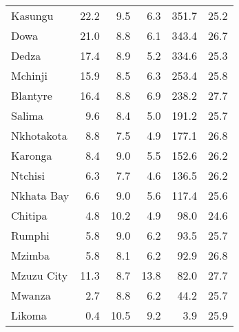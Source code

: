 \begin{tabular}{lrrrrr}
Kasungu       &        22.2 &         9.5 &          6.3 &            351.7 &        25.2 \\
Dowa          &        21.0 &         8.8 &          6.1 &            343.4 &        26.7 \\
Dedza         &        17.4 &         8.9 &          5.2 &            334.6 &        25.3 \\
Mchinji       &        15.9 &         8.5 &          6.3 &            253.4 &        25.8 \\
Blantyre      &        16.4 &         8.8 &          6.9 &            238.2 &        27.7 \\
Salima        &         9.6 &         8.4 &          5.0 &            191.2 &        25.7 \\
Nkhotakota    &         8.8 &         7.5 &          4.9 &            177.1 &        26.8 \\
Karonga       &         8.4 &         9.0 &          5.5 &            152.6 &        26.2 \\
Ntchisi       &         6.3 &         7.7 &          4.6 &            136.5 &        26.2 \\
Nkhata Bay    &         6.6 &         9.0 &          5.6 &            117.4 &        25.6 \\
Chitipa       &         4.8 &        10.2 &          4.9 &             98.0 &        24.6 \\
Rumphi        &         5.8 &         9.0 &          6.2 &             93.5 &        25.7 \\
Mzimba        &         5.8 &         8.1 &          6.2 &             92.9 &        26.8 \\
Mzuzu City    &        11.3 &         8.7 &         13.8 &             82.0 &        27.7 \\
Mwanza        &         2.7 &         8.8 &          6.2 &             44.2 &        25.7 \\
Likoma        &         0.4 &        10.5 &          9.2 &              3.9 &        25.9 \\
\bottomrule
\end{tabular}
